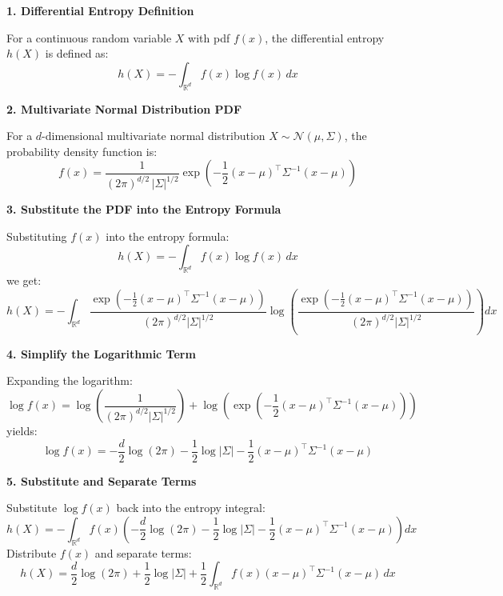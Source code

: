 \documentclass{article}
\begin{document}
\textbf{1. \textbf{Differential Entropy Definition}}

For a continuous random variable \( X \) with pdf \( f(x) \), the differential entropy \( h(X) \) is defined as:
\[
h(X) = - \int_{\mathbb{R}^d} f(x) \log f(x) \, dx
\]

\textbf{2. \textbf{Multivariate Normal Distribution PDF}}

For a \( d \)-dimensional multivariate normal distribution \( X \sim \mathcal{N}(\mu, \Sigma) \), the probability density function is:
\[
f(x) = \frac{1}{(2 \pi)^{d/2} \, |\Sigma|^{1/2}} \exp \left( -\frac{1}{2} (x - \mu)^\top \Sigma^{-1} (x - \mu) \right)
\]


\textbf{3. \textbf{Substitute the PDF into the Entropy Formula}}

Substituting \( f(x) \) into the entropy formula:
\[
h(X) = - \int_{\mathbb{R}^d} f(x) \log f(x) \, dx
\]
we get:
\[
h(X) = - \int_{\mathbb{R}^d} \frac{\exp \left( -\frac{1}{2} (x - \mu)^\top \Sigma^{-1} (x - \mu) \right)}{(2 \pi)^{d/2} |\Sigma|^{1/2}}  \log \left( \frac{\exp \left( -\frac{1}{2} (x - \mu)^\top \Sigma^{-1} (x - \mu) \right)}{(2 \pi)^{d/2} |\Sigma|^{1/2}}  \right) dx
\]


\textbf{4. \textbf{Simplify the Logarithmic Term}}

Expanding the logarithm:
\[
\log f(x) = \log \left( \frac{1}{(2 \pi)^{d/2} |\Sigma|^{1/2}} \right) + \log \left( \exp \left( -\frac{1}{2} (x - \mu)^\top \Sigma^{-1} (x - \mu) \right) \right)
\]
yields:
\[
\log f(x) = -\frac{d}{2} \log(2 \pi) - \frac{1}{2} \log |\Sigma| - \frac{1}{2} (x - \mu)^\top \Sigma^{-1} (x - \mu)
\]

\textbf{5. \textbf{Substitute and Separate Terms}}

Substitute \( \log f(x) \) back into the entropy integral:
\[
h(X) = - \int_{\mathbb{R}^d} f(x) \left( -\frac{d}{2} \log(2 \pi) - \frac{1}{2} \log |\Sigma| - \frac{1}{2} (x - \mu)^\top \Sigma^{-1} (x - \mu) \right) dx
\]
Distribute \( f(x) \) and separate terms:
\[
h(X) = \frac{d}{2} \log(2 \pi) + \frac{1}{2} \log |\Sigma| + \frac{1}{2} \int_{\mathbb{R}^d} f(x) (x - \mu)^\top \Sigma^{-1} (x - \mu) \, dx
\]
\end{document}
